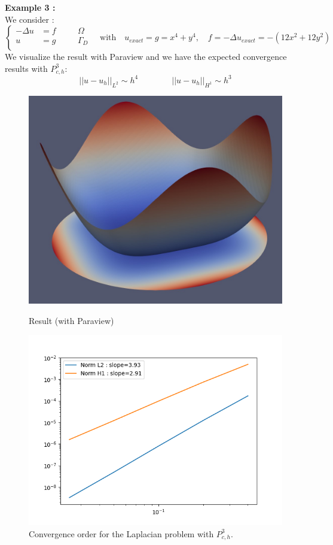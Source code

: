 \noindent\textbf{Example 3 :} \\
We consider :
$$\left\{\begin{aligned}
	-\Delta u &= f \quad&&\Omega \\
	u&=g \quad&&\Gamma_D \\
\end{aligned}\right. \quad \text{with} \quad
u_{exact}=g=x^4+y^4, \quad f=-\Delta u_{exact}=-(12x^2+12y^2)$$
\noindent We visualize the result with Paraview and we have the expected convergence results  with $P_{c,h}^3$:
$$||u-u_h||_{L^2}\sim h^4 \qquad \qquad ||u-u_h||_{H^1}\sim h^3$$
\begin{figure}[H]
	\begin{minipage}{0.48\linewidth}
		\centering
		\includegraphics[width=0.7\linewidth]{"images/parareal/feelpp/circle_result_3.jpg"}
		\caption{Result (with Paraview)}
	\end{minipage}
	\begin{minipage}{0.48\linewidth}
		\centering\includegraphics[width=0.9\linewidth]{"images/parareal/feelpp/cvg_laplacian_k3_o4.png"}
		\caption{Convergence order for the Laplacian problem with $P_{c,h}^3$.}
	\end{minipage}
\end{figure}

